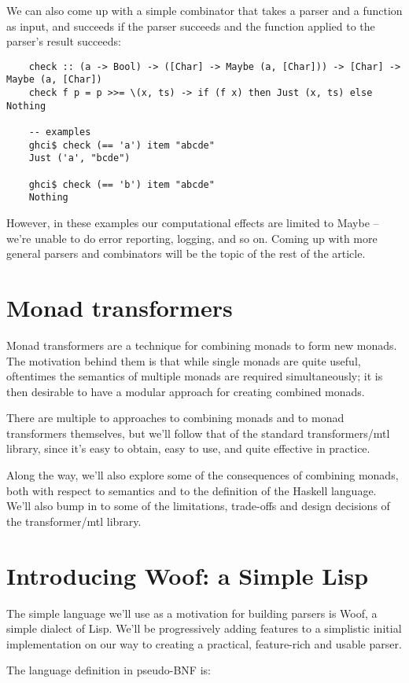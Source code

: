 \documentclass{tmr}
\begin{document}
We can also come up with a simple combinator that takes a parser and a function
as input, and succeeds if the parser succeeds and the function applied to the
parser's result succeeds:
\begin{verbatim}
    check :: (a -> Bool) -> ([Char] -> Maybe (a, [Char])) -> [Char] -> Maybe (a, [Char])
    check f p = p >>= \(x, ts) -> if (f x) then Just (x, ts) else Nothing
    
    -- examples
    ghci$ check (== 'a') item "abcde"
    Just ('a', "bcde")
    
    ghci$ check (== 'b') item "abcde"
    Nothing
\end{verbatim}
However, in these examples our computational effects are limited to Maybe -- we're
unable to do error reporting, logging, and so on.  Coming up with more general 
parsers and combinators will be the topic of the rest of the article.


\section{Monad transformers}
Monad transformers are a technique for combining monads to form new monads.
The motivation behind them is that while single monads are quite useful, oftentimes
the semantics of multiple monads are required simultaneously; it is then desirable
to have a modular approach for creating combined monads.

There are multiple to approaches to combining monads and to monad transformers
themselves, but we'll follow that of the standard transformers/mtl library, since
it's easy to obtain, easy to use, and quite effective in practice.

Along the way, we'll also explore some of the consequences of combining monads,
both with respect to semantics and to the definition of the Haskell language.  We'll
also bump in to some of the limitations, trade-offs and design decisions of the 
transformer/mtl library.


\section{Introducing Woof:  a Simple Lisp}
The simple language we'll use as a motivation for building parsers is 
Woof, a simple dialect of Lisp.  We'll be 
progressively adding features to a simplistic initial implementation
on our way to creating a practical, feature-rich and usable parser.

The language definition in pseudo-BNF is:
\end{document}
